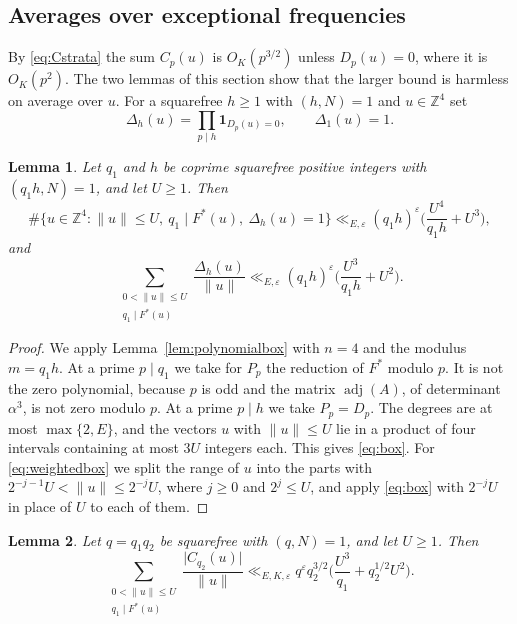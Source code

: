 \documentclass[11pt]{amsart}
\numberwithin{equation}{section}
\numberwithin{figure}{section}
\newtheorem{lemma}{Lemma}[section]
\theoremstyle{definition}
\newcommand{\Z}{\mathbb{Z}}
\newcommand{\eps}{\varepsilon}
\newcommand{\abs}[1]{\lvert #1\rvert}
\newcommand{\adj}{\operatorname{adj}}
\begin{document}
\subsection{Averages over exceptional frequencies}\label{sec:average}

By \eqref{eq:Cstrata} the sum $C_p(u)$ is $O_K(p^{3/2})$ unless
$D_p(u)=0$, where it is $O_K(p^2)$. The two lemmas
of this section show that the larger bound is harmless on average
over $u$. For a squarefree $h\ge1$ with $(h,N)=1$ and $u\in\Z^4$ set
\[
 \Delta_h(u)=\prod_{p\mid h}\mathbf 1_{D_p(u)=0},\qquad\Delta_1(u)=1.
\]

\begin{lemma}\label{lem:box}
Let $q_1$ and $h$ be coprime squarefree positive integers with
$(q_1h,N)=1$, and let $U\ge1$. Then
\begin{equation}\label{eq:box}
 \#\{u\in\Z^4:\lVert u\rVert\le U,\ q_1\mid F^*(u),\ \Delta_h(u)=1\}
 \ll_{E,\eps}(q_1h)^\eps\Big(\frac{U^4}{q_1h}+U^3\Big),
\end{equation}
and
\begin{equation}\label{eq:weightedbox}
 \sum_{\substack{0<\lVert u\rVert\le U\\q_1\mid F^*(u)}}
 \frac{\Delta_h(u)}{\lVert u\rVert}
 \ll_{E,\eps}(q_1h)^\eps\Big(\frac{U^3}{q_1h}+U^2\Big).
\end{equation}
\end{lemma}

\begin{proof}
We apply Lemma~\ref{lem:polynomialbox} with $n=4$ and the modulus
$m=q_1h$. At a prime $p\mid q_1$ we take for $P_p$ the reduction of
$F^*$ modulo $p$. It is not the zero polynomial, because $p$ is odd
and the matrix $\adj(A)$, of determinant $\alpha^3$, is not zero
modulo $p$. At a prime $p\mid h$ we take $P_p=D_p$. The degrees are
at most $\max\{2,E\}$, and the vectors $u$ with
$\lVert u\rVert\le U$ lie in a product of four intervals containing
at most $3U$ integers each. This gives \eqref{eq:box}. For
\eqref{eq:weightedbox} we split the range of $u$ into the parts with
$2^{-j-1}U<\lVert u\rVert\le2^{-j}U$, where $j\ge0$ and $2^j\le U$,
and apply \eqref{eq:box} with $2^{-j}U$ in place of $U$ to each of
them.
\end{proof}

\begin{lemma}\label{lem:average}
Let $q=q_1q_2$ be squarefree with $(q,N)=1$, and let $U\ge1$. Then
\begin{equation}\label{eq:average}
 \sum_{\substack{0<\lVert u\rVert\le U\\q_1\mid F^*(u)}}
 \frac{\abs{C_{q_2}(u)}}{\lVert u\rVert}
 \ll_{E,K,\eps}q^\eps q_2^{3/2}\Big(\frac{U^3}{q_1}+q_2^{1/2}U^2\Big).
\end{equation}
\end{lemma}
\end{document}
